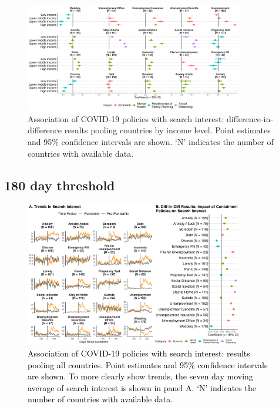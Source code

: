 \documentclass{article}
\begin{document}
\begin{figure}[H]
    \centering
    \includegraphics[width=0.85\textwidth]{figures/did_income_120.png}
    \caption{Association of COVID-19 policies with search interest: difference-in-difference results pooling countries by income level. Point estimates and 95\% confidence intervals are shown. `N' indicates the number of countries with available data.}
    \label{fig:did_income_120}
\end{figure}

\newpage
\subsection{180 day threshold}

\begin{figure}[H]
    \centering
    \includegraphics[width=0.85\textwidth]{figures/did_overall_180.png}
    \caption{\textcolor{black}{Association of COVID-19 policies with search interest: results pooling all countries. Point estimates and 95\% confidence intervals are shown. To more clearly show trends, the seven day moving average of search interest is shown in panel A. `N' indicates the number of countries with available data.}}
    \label{fig:lockdown_impact_180}
\end{figure}
\end{document}
